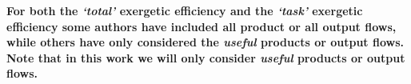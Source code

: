 \textbf{For both the \emph{`total'} exergetic efficiency and the \emph{`task'} exergetic efficiency some authors have included all product or all output flows, while others have only considered the \emph{useful} products or output flows. Note that in this work we will only consider \emph{useful} products or output flows.}







 
 



